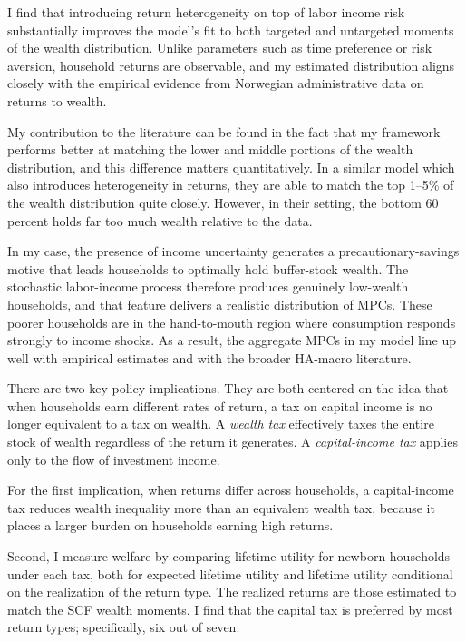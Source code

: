 \documentclass{scrartcl}
\begin{document}
\vspace{0.5em}
\noindent
I find that introducing return heterogeneity on top of labor income risk substantially improves the model’s fit to both targeted and untargeted moments of the wealth distribution. Unlike parameters such as time preference or risk aversion, household returns are observable, and my estimated distribution aligns closely with the empirical evidence from Norwegian administrative data on returns to wealth.

\vspace{0.5em}
\noindent
My contribution to the literature can be found in the fact that my framework performs better at matching the lower and middle portions of the wealth distribution, and this difference matters quantitatively. In a similar model which also introduces heterogeneity in returns, they are able to match the top 1--5\% of the wealth distribution quite closely. However, in their setting, the bottom 60 percent holds far too much wealth relative to the data.

In my case, the presence of income uncertainty generates a precautionary-savings motive that leads households to optimally hold buffer-stock wealth. The stochastic labor-income process therefore produces genuinely low-wealth households, and that feature delivers a realistic distribution of MPCs. These poorer households are in the hand-to-mouth region where consumption responds strongly to income shocks. As a result, the aggregate MPCs in my model line up well with empirical estimates and with the broader HA-macro literature.


\vspace{0.5em}
\noindent

There are two key policy implications. They are both centered on the idea that when households earn different rates of return, a tax on capital income is no longer equivalent to a tax on wealth. A \textit{wealth tax} effectively taxes the entire stock of wealth regardless of the return it generates. A \textit{capital-income tax} applies only to the flow of investment income.

For the first implication, when returns differ across households, a capital-income tax reduces wealth inequality more than an equivalent wealth tax, because it places a larger burden on households earning high returns.

\par Second, I measure welfare by comparing lifetime utility for newborn households under each tax, both for expected lifetime utility and lifetime utility conditional on the realization of the return type. The realized returns are those estimated to match the SCF wealth moments. I find that the capital tax is preferred by most return types; specifically, six out of seven.
\end{document}

